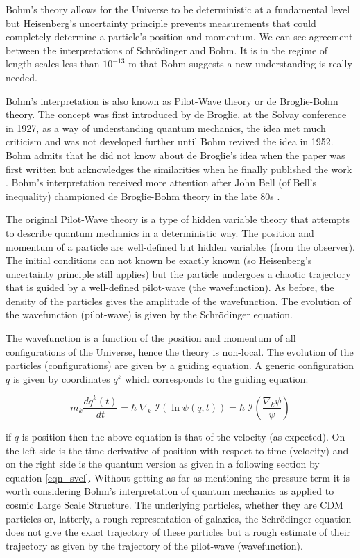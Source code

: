 Bohm's theory allows for the Universe to be deterministic at a fundamental level but Heisenberg's uncertainty principle prevents measurements that could completely determine a particle's position and momentum. We can see agreement between the interpretations of Schr\"odinger and Bohm. It is in the regime of length scales less than $10^{-13}$ m that Bohm suggests a new understanding is really needed.

Bohm's interpretation is also known as Pilot-Wave theory or de Broglie-Bohm theory. The concept was first introduced by de Broglie, at the Solvay conference in 1927, as a way of understanding quantum mechanics, the idea met much criticism and was not developed further until Bohm revived the idea in 1952. Bohm admits that he did not know about de Broglie's idea when the paper was first written but acknowledges the similarities when he finally published the work \citep{bib_bohm, bib_bohm2}. Bohm's interpretation received more attention after John Bell (of Bell's inequality) championed de Broglie-Bohm theory in the late 80s \citep{bib_bell}.

The original Pilot-Wave theory is a type of hidden variable theory that attempts to describe quantum mechanics in a deterministic way. The position and momentum of a particle are well-defined but hidden variables (from the observer). The initial conditions can not known be exactly known (so Heisenberg's uncertainty principle still applies) but the particle undergoes a chaotic trajectory that is guided by a well-defined pilot-wave (the wavefunction). As before, the density of the particles gives the amplitude of the wavefunction. The evolution of the wavefunction (pilot-wave) is given by the Schr\"odinger equation.

The wavefunction is a function of the position and momentum of all configurations of the Universe, hence the theory is non-local. The evolution of the particles (configurations) are given by a guiding equation. A generic configuration $q$ is given by coordinates $q^k$ which corresponds to the guiding equation:

\begin{equation}
m_k\frac{d q^k(t)}{dt} = \hbar\;\nabla_k\;\mathcal{I}(\ln \psi(q,t)) = \hbar\; \mathcal{I}\left(\frac{\nabla_k \psi}{\psi} \right)
\end{equation}

\noindent if $q$ is position then the above equation is that of the velocity (as expected). On the left side is the time-derivative of position with respect to time (velocity) and on the right side is the quantum version as given in a following section by equation \ref{eqn_svel}. Without getting as far as mentioning the pressure term it is worth considering Bohm's interpretation of quantum mechanics as applied to cosmic Large Scale Structure. The underlying particles, whether they are CDM particles or, latterly, a rough representation of galaxies, the Schr\"odinger equation does not give the exact trajectory of these particles but a rough estimate of their trajectory as given by the trajectory of the pilot-wave (wavefunction).

